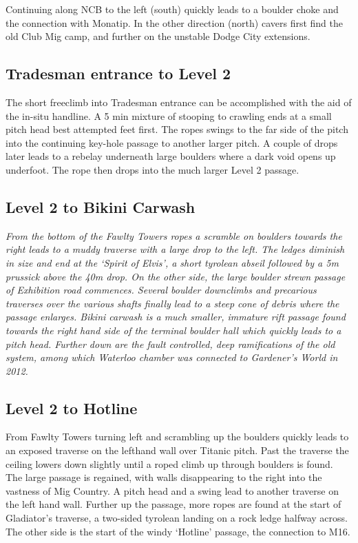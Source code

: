  Continuing along NCB to the left (south) quickly leads to a boulder choke and the connection with Monatip. In the other direction (north) cavers first find the old Club Mig camp, and further on the unstable Dodge City extensions.

\subsection{Tradesman entrance to Level 2}
The short freeclimb into Tradesman entrance can be accomplished with the aid of the in-situ handline. A 5 min mixture of stooping to crawling ends at a small pitch head best attempted feet first. The ropes swings to the far side of the pitch into the continuing key-hole passage  to another larger pitch. A couple of drops later leads to a rebelay underneath large boulders where a dark void opens up underfoot. The rope then drops into the much larger Level 2 passage.

\subsection{Level 2 to Bikini Carwash}
\textit{From the bottom of the Fawlty Towers ropes a scramble on boulders towards the right leads to a muddy traverse with a large drop to the left. The ledges diminish in size and end at the ‘Spirit of Elvis’, a short tyrolean abseil followed by a 5m prussick above the 40m drop. On the other side, the large boulder strewn passage of Exhibition road commences. Several boulder downclimbs and precarious traverses over the various shafts finally lead to a steep cone of debris where the passage enlarges. Bikini carwash is a much smaller, immature rift passage found towards the right hand side of the terminal boulder hall which quickly leads to a pitch head. Further down are the fault controlled, deep ramifications of the old system, among which Waterloo chamber was connected to Gardener’s World in 2012.}

\subsection{Level 2 to  Hotline}
From Fawlty Towers turning left and scrambling up the boulders quickly leads to an exposed traverse on the lefthand wall over Titanic pitch. Past the traverse the ceiling lowers down slightly until a roped climb up through boulders is found. The large passage is regained, with walls disappearing to the right into the vastness of Mig Country. A pitch head and a swing lead to another traverse on the left hand wall. Further up the passage, more ropes are found at the start of Gladiator’s traverse, a two-sided tyrolean landing on a rock ledge halfway across. The other side is the start of the windy ‘Hotline’ passage, the connection to M16.

